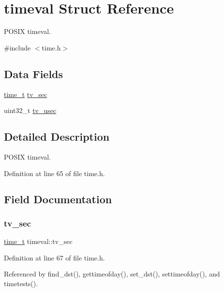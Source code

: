 \hypertarget{structtimeval}{}\section{timeval Struct Reference}
\label{structtimeval}


P\+O\+S\+IX timeval.  




{\ttfamily \#include $<$time.\+h$>$}

\subsection*{Data Fields}
\begin{DoxyCompactItemize}
\item 
\hyperlink{time_8h_a3346b04b0420b32ccf6b706551b70762}{time\+\_\+t} \hyperlink{structtimeval_aef6ddab1064c430758f9f913b7e4a21e}{tv\+\_\+sec}
\item 
uint32\+\_\+t \hyperlink{structtimeval_a8fd7abf5420981b3ff58bb23df458587}{tv\+\_\+usec}
\end{DoxyCompactItemize}


\subsection{Detailed Description}
P\+O\+S\+IX timeval. 

Definition at line 65 of file time.\+h.



\subsection{Field Documentation}
\mbox{\label{structtimeval_aef6ddab1064c430758f9f913b7e4a21e}} 
\subsubsection{\texorpdfstring{tv\+\_\+sec}{tv\_sec}}
{\footnotesize\ttfamily \hyperlink{time_8h_a3346b04b0420b32ccf6b706551b70762}{time\+\_\+t} timeval\+::tv\+\_\+sec}



Definition at line 67 of file time.\+h.



Referenced by find\+\_\+dst(), gettimeofday(), set\+\_\+dst(), settimeofday(), and timetests().

